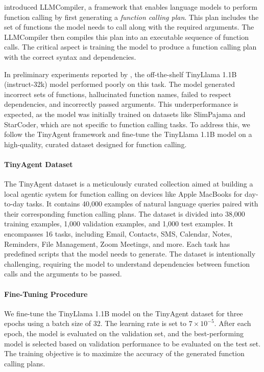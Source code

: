 \citet{llmcompiler} introduced LLMCompiler, a framework that enables language models to perform function calling by first generating a \emph{function calling plan}. This plan includes the set of functions the model needs to call along with the required arguments. The LLMCompiler then compiles this plan into an executable sequence of function calls. The critical aspect is training the model to produce a function calling plan with the correct syntax and dependencies.

In preliminary experiments reported by \citet{tinyagent}, the off-the-shelf TinyLlama 1.1B (instruct-32k) model performed poorly on this task. The model generated incorrect sets of functions, hallucinated function names, failed to respect dependencies, and incorrectly passed arguments. This underperformance is expected, as the model was initially trained on datasets like SlimPajama and StarCoder, which are not specific to function calling tasks. To address this, we follow the TinyAgent framework and fine-tune the TinyLlama 1.1B model on a high-quality, curated dataset designed for function calling.

\paragraph{TinyAgent Dataset}

The TinyAgent dataset is a meticulously curated collection aimed at building a local agentic system for function calling on devices like Apple MacBooks for day-to-day tasks. It contains 40,000 examples of natural language queries paired with their corresponding function calling plans. The dataset is divided into 38,000 training examples, 1,000 validation examples, and 1,000 test examples. It encompasses 16 tasks, including Email, Contacts, SMS, Calendar, Notes, Reminders, File Management, Zoom Meetings, and more. Each task has predefined scripts that the model needs to generate. The dataset is intentionally challenging, requiring the model to understand dependencies between function calls and the arguments to be passed.

\paragraph{Fine-Tuning Procedure}

We fine-tune the TinyLlama 1.1B model on the TinyAgent dataset for three epochs using a batch size of 32. The learning rate is set to \(7 \times 10^{-5}\). After each epoch, the model is evaluated on the validation set, and the best-performing model is selected based on validation performance to be evaluated on the test set. The training objective is to maximize the accuracy of the generated function calling plans.


